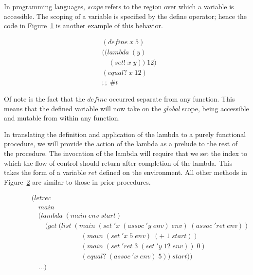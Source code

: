 In programming languages, \emph{scope} refers to the region over which a variable is
accessible. The scoping of a variable is specified by the define operator; hence the 
code in Figure~\ref{fig:setScopeExample} is another example of this behavior.

\begin{figure}[htp]
\footnotesize
\caption{}\label{fig:setScopeExample}
\begin{align*}
& (define \; x \; 5)
\\& ((lambda \; (y)
\\& \quad (set! \; x \; y)) \; 12)
\\& (equal? \; x \; 12) \; 
\\& ;; \; \#t
\end{align*}
\end{figure}

Of note is the fact that the $define$ occurred separate from any function. This 
means that the defined variable will now take on the \emph{global} scope, being accessible 
and mutable from within any function. 

In translating the definition and application of the lambda to a purely
functional procedure, we will provide the action of the lambda as a prelude to
the rest of the procedure. The invocation of the lambda will require that we
set the index to which the flow of control should return after completion of
the lambda. This takes the form of a variable $ret$ defined on the environment.
All other methods in Figure~\ref{fig:imperFunc} are similar to those in prior
procedures.

\begin{figure}[htp]
\footnotesize
\caption{}\label{fig:imperFunc}
\begin{align*}
& (letrec \; 
\\& \quad main \; 
\\& \quad (lambda \; (main \; env \; start)
\\& \qquad (get \; (list \; (main \; (set \; 'x \; (assoc \; 'y \; env) \; env) \; (assoc \; 'ret \; env))
\\& \qquad \qquad \qquad \quad \; (main \; (set \; 'x \; 5 \; env) \; (+ \; 1 \; start))
\\& \qquad \qquad \qquad \quad \; (main \; (set \; 'ret \; 3 \; (set \; 'y \; 12 \; env)) \; 0)
\\& \qquad \qquad \qquad \quad \; (equal? \; (assoc \; 'x \; env) \; 5)) \; start))
\\& \quad \dots)
\end{align*}
\end{figure}

